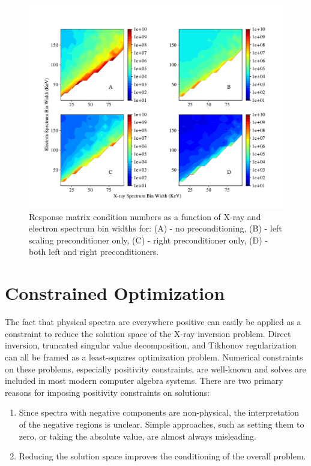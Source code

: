 \begin{figure}[p]
    \centering
    \includegraphics[width=1.1\textwidth]{figures/chapter_4/condition_number_binning_precondition/condition_number_binning_precondition2.pdf}
    \caption{Response matrix condition numbers as a function of X-ray and electron spectrum bin widths for: (A) - no preconditioning, (B) - left scaling preconditioner only, (C) - right preconditioner only, (D) - both left and right preconditioners. }
    \label{condition_number_binning_withprecondition}
\end{figure}

\section{Constrained Optimization}

The fact that physical spectra are everywhere positive can easily be applied as a constraint to reduce the solution space of the X-ray inversion problem. Direct inversion, truncated singular value decomposition, and Tikhonov regularization can all be framed as a least-squares optimization problem. Numerical constraints on these problems, especially positivity constraints, are well-known and solves are included in most modern computer algebra systems. There are two primary reasons for imposing positivity constraints on solutions:

\begin{enumerate}
    \item Since spectra with negative components are non-physical, the interpretation of the negative regions is unclear. Simple approaches, such as setting them to zero, or taking the absolute value, are almost always misleading. \item Reducing the solution space improves the conditioning of the overall problem.
\end{enumerate}

